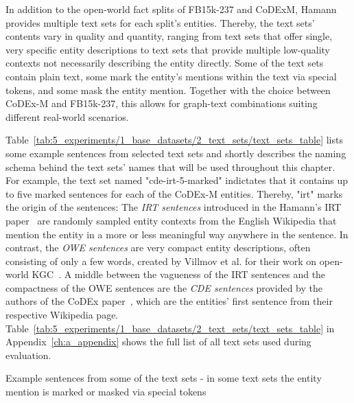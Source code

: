 In addition to the open-world fact splits of FB15k-237 and CoDExM, Hamann provides multiple text sets for each split's entities. Thereby, the text sets' contents vary in quality and quantity, ranging from text sets that offer single, very specific entity descriptions to text sets that provide multiple low-quality contexts not necessarily describing the entity directly. Some of the text sets contain plain text, some mark the entity's mentions within the text via special tokens, and some mask the entity mention. Together with the choice between CoDEx-M and FB15k-237, this allows for graph-text combinations suiting different real-world scenarios.

Table~\ref{tab:5_experiments/1_base_datasets/2_text_sets/text_sets_table} lists some example sentences from selected text sets and shortly describes the naming schema behind the text sets' names that will be used throughout this chapter. For example, the text set named "cde-irt-5-marked" indictates that it contains up to five marked sentences for each of the CoDEx-M entities. Thereby, "irt" marks the origin of the sentences: The \emph{IRT sentences} introduced in the Hamann's IRT paper~\cite{} are randomly sampled entity contexts from the English Wikipedia that mention the entity in a more or less meaningful way anywhere in the sentence. In contrast, the \emph{OWE sentences} are very compact entity descriptions, often consisting of only a few words, created by Villmov et al. for their work on open-world KGC~\cite{Shah2019AnOE}. A middle between the vagueness of the IRT sentences and the compactness of the OWE sentences are the \emph{CDE sentences} provided by the authors of the CoDEx paper~\cite{}, which are the entities' first sentence from their respective Wikipedia page. Table~\ref{tab:5_experiments/1_base_datasets/2_text_sets/text_sets_table} in Appendix~\ref{ch:a_appendix} shows the full list of all text sets used during evaluation.

\begin{table}
    \centering
    
    \caption{Example sentences from some of the text sets - in some text sets the entity mention is marked or masked via special tokens}
    \label{tab:5_experiments/1_base_datasets/2_text_sets/text_sets_table}
\end{table}
